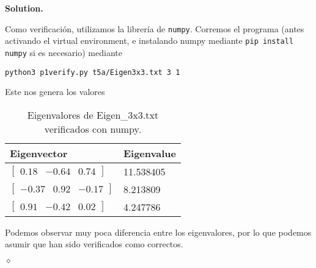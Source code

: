 \documentclass{article}
\theoremstyle{problemstyle}
\newenvironment{solution}{%
  \begin{mdframed}[linewidth=0.8pt,linecolor=Gray,backgroundcolor=Gray!5,roundcorner=5pt]%
  \noindent\textbf{Solution.}%
}{%
\hfill $ \diamond $ 
  \end{mdframed}%
}
\begin{document}
\begin{solution}
\begin{enumerate}
		      Como verificaci\'on, utilizamos la librer\'ia de \texttt{numpy}. Corremos el programa (antes activando el virtual environment, e instalando numpy mediante \texttt{pip install numpy} si es necesario) mediante
		      \begin{center}
			      \texttt{python3 p1\textunderscore verify.py t5a/Eigen\textunderscore3x3.txt 3 1}
		      \end{center}
		      Este nos genera los valores
		      \begin{table}[H]
			      \begin{center}
				      \begin{tabular}{|l|l|}
					      \hline
					      Eigenvector           & Eigenvalue \\
					      \hline
					      \rule{0pt}{1.5em}
					      $ \begin{bmatrix}
							        0.18 & -0.64 & 0.74
						        \end{bmatrix} $  & 11.538405     \\
					      [0.5em]
					      \hline
					      \rule{0pt}{1.5em}
					      $ \begin{bmatrix}
							        -0.37 & 0.92 & -0.17
						        \end{bmatrix} $ & 8.213809       \\
					      [0.5em]
					      \hline
					      \rule{0pt}{1.5em}
					      $ \begin{bmatrix}
							        0.91 & -0.42 & 0.02
						        \end{bmatrix} $  & 4.247786      \\
					      [0.5em]
					      \hline
				      \end{tabular}
			      \end{center}
			      \caption{Eigenvalores de Eigen\_3x3.txt verificados con numpy.}\label{tab:py3x3}
		      \end{table}
		      Podemos observar muy poca diferencia entre los eigenvalores, por lo
		      que podemos asumir que han sido verificados como correctos.


\end{enumerate}
\end{solution}
\end{document}

